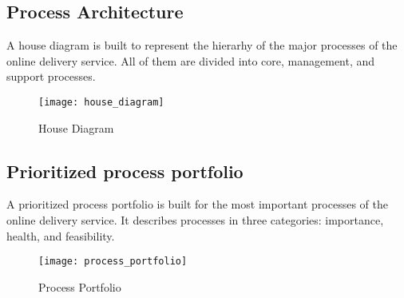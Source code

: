 \subsection{Process Architecture}

A house diagram is built to represent the hierarhy of the major processes of the online delivery service.
All of them are divided into core, management, and support processes.


\begin{figure}[ht!]
	\centering
	\texttt{[image: house\_diagram]}
	\caption{House Diagram}
	\label{fig:house_diagram}
\end{figure}

\subsection{Prioritized process portfolio}

A prioritized process portfolio is built for the most important processes of the online delivery service.
It describes processes in three categories: importance, health, and feasibility.

\begin{figure}[ht!]
	\centering
	\texttt{[image: process\_portfolio]}
	\caption{Process Portfolio}
	\label{fig:process_portfolio}
\end{figure}
